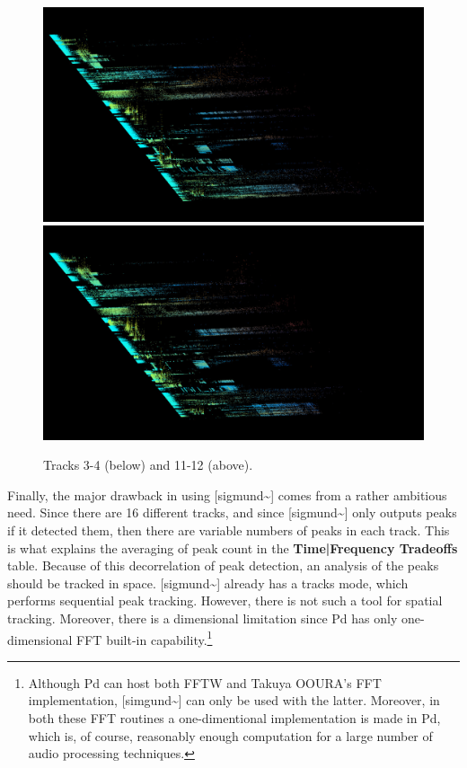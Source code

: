 \documentclass{article}
\begin{document}
\begin{figure}
\begin{multicols}{2}
    \includegraphics[width=\linewidth]{preset-50-3.jpg}%
    \includegraphics[width=\linewidth]{preset-50-4.jpg}%
\end{multicols}
    
\caption{Tracks 3-4 (below) and 11-12 (above).}
\end{figure}


Finally, the major drawback in using [sigmund\~{}] comes from a rather ambitious need. Since there are 16 different tracks, and since [sigmund\~{}] only outputs peaks if it detected them, then there are variable numbers of peaks in each track. This is what explains the averaging of peak count in the \textbf{Time|Frequency Tradeoffs} table. Because of this decorrelation of peak detection, an analysis of the peaks should be tracked in space. [sigmund\~{}] already has a tracks mode, which performs sequential peak tracking. However, there is not such a tool for spatial tracking. Moreover, there is a dimensional limitation since Pd has only one-dimensional FFT built-in capability.\footnote{Although Pd can host both FFTW and Takuya OOURA's FFT implementation, [simgund\~{}] can only be used with the latter. Moreover, in both these FFT routines a one-dimentional implementation is made in Pd, which is, of course, reasonably enough computation for a large number of audio processing techniques.} 
\end{document}
